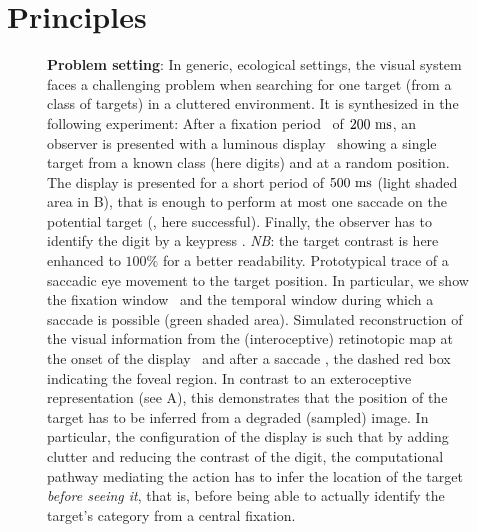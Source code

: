 \section*{Principles}
\label{sec:principles}

\begin{figure}[t!]%
	\caption{%
		{\bf Problem setting}: In generic, ecological settings, the visual system faces a challenging problem when searching for one target (from a class of targets) in a cluttered environment. It is synthesized in the following experiment: %
		\A After a fixation period \FIX\ of $200~\si{\milli\second}$, an observer is presented with a luminous display \DIS\ showing a single target from a known class (here digits) and at a random position. The display is presented for a short period of $500~\si{\milli\second}$ (light shaded area in B), that is enough to perform at most one saccade on the potential target (\SAC , here successful). Finally, the observer has to identify the digit by a keypress \ANS. \emph{NB}: the target contrast is here enhanced to $100\%$ for a better readability. %
		\B Prototypical trace of a saccadic eye movement to the target position. In particular, we show the fixation window \FIX\ and the temporal window during which a saccade is possible (green shaded area). %
		\C Simulated reconstruction of the visual information from the (interoceptive) retinotopic map at the onset of the display \DIS\ and after a saccade \SAC , the dashed red box indicating the foveal region. In contrast to an exteroceptive representation (see A), this demonstrates that the position of the target has to be inferred from a degraded (sampled) image. In particular, the configuration of the display is such that by adding clutter and reducing the contrast of the digit, %
		the computational pathway mediating the action has to infer the location of the target \emph{before seeing it}, that is, before being able to actually identify the target's category from a central fixation. }%
		\label{fig:intro} %
\end{figure}%

